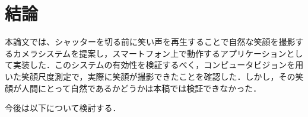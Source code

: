 \documentclass[submit,techreq]{ec2014}
\begin{document}
%
%
%
%
%
%

\section{結論}

本論文では、シャッターを切る前に笑い声を再生することで自然な笑顔を撮影するカメラシステムを提案し，スマートフォン上で動作するアプリケーションとして実装した．このシステムの有効性を検証するべく，コンピュータビジョンを用いた笑顔尺度測定で，実際に笑顔が撮影できたことを確認した．しかし，その笑顔が人間にとって自然であるかどうかは本稿では検証できなかった．

今後は以下について検討する．
\end{document}
